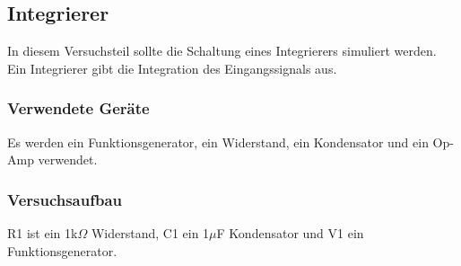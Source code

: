 \documentclass[12pt,a4paper]{article}
\begin{document}
\subsection{Integrierer}

In diesem Versuchsteil sollte die Schaltung eines Integrierers simuliert werden. Ein Integrierer gibt die Integration des Eingangssignals aus.

\subsubsection{Verwendete Geräte}

Es werden ein Funktionsgenerator, ein Widerstand, ein Kondensator und ein Op-Amp verwendet.


\subsubsection{Versuchsaufbau}

R1 ist ein 1k$\Omega$ Widerstand, C1 ein 1$\mu$F Kondensator und V1 ein Funktionsgenerator.
\end{document}
